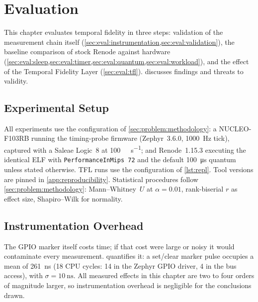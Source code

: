 \chapter{Evaluation}
\label{ch:evaluation}

This chapter evaluates temporal fidelity in three steps: validation of
the measurement chain itself
(\cref{sec:eval:instrumentation,sec:eval:validation}), the baseline
comparison of stock Renode against hardware
(\cref{sec:eval:sleep,sec:eval:timer,sec:eval:quantum,sec:eval:workload}),
and the effect of the Temporal Fidelity Layer
(\cref{sec:eval:tfl}).  discusses findings
and threats to validity.

\section{Experimental Setup}
\label{sec:eval:setup}

All experiments use the configuration of \cref{sec:problem:methodology}:
a NUCLEO-F103RB running the timing-probe firmware (Zephyr~3.6.0,
\SI{1000}{\hertz} tick), captured with a Saleae Logic~8 at
\SI{100}{\mega\sample\per\second}; and Renode~1.15.3 executing the identical ELF with
\texttt{PerformanceInMips~72} and the default
\SI{100}{\micro\second} quantum unless stated otherwise. TFL runs use
the configuration of \cref{lst:repl}. Tool versions are pinned in
\cref{app:reproducibility}. Statistical procedures follow
\cref{sec:problem:methodology}: Mann--Whitney~$U$ at $\alpha = 0.01$,
rank-biserial $r$ as effect size, Shapiro--Wilk for normality.

\section{Instrumentation Overhead}
\label{sec:eval:instrumentation}

The GPIO marker itself costs time; if that cost were large or noisy it
would contaminate every measurement. 
quantifies it: a set/clear marker pulse occupies a mean of
\SI{261}{\nano\second} (18 CPU cycles: 14 in the Zephyr GPIO driver, 4
in the bus access), with $\sigma = \SI{10}{\nano\second}$. All measured
effects in this chapter are two to four orders of magnitude larger, so
instrumentation overhead is negligible for the conclusions drawn.

